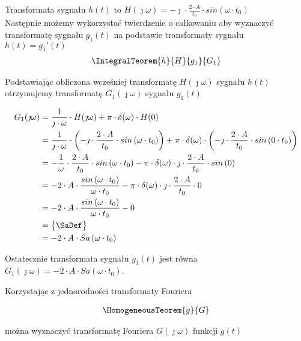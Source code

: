 \begin{task}
Transformata sygnału $h(t)$ to $H(\jmath \omega)=-\jmath \cdot \frac{2\cdot A}{t_0} \cdot sin\left( \omega \cdot t_0\right)$
\\

Następnie możemy wykorzystać twierdzenie o całkowaniu aby wyznaczyć transformatę sygnału $g_1(t)$ na podstawie transformaty sygnału $h(t)=g_1'(t)$
\begin{align*}
\IntegralTeorem{h}{H}{g_1}{G_1}
\end{align*}

Podstawiając obliczona wcześniej transformatę $H(\jmath \omega)$ sygnału $h(t)$ otrzymujemy transformatę $G_1(\jmath \omega)$ sygnału $g_1(t)$

\begin{align*}
G_1(\jmath \omega) &= \frac{1}{\jmath \cdot \omega} \cdot H(\jmath \omega) + \pi \cdot \delta(\omega) \cdot H(0)\\
&=\frac{1}{\jmath \cdot \omega} \cdot \left(-\jmath \cdot \frac{2\cdot A}{t_0} \cdot sin\left( \omega \cdot t_0\right)\right) + \pi \cdot \delta(\omega) \cdot \left(-\jmath \cdot \frac{2\cdot A}{t_0} \cdot sin\left( 0 \cdot t_0\right)\right)\\
&=-\frac{1}{\omega} \cdot \frac{2\cdot A}{t_0}\cdot sin\left( \omega \cdot t_0\right) - \pi \cdot \delta(\omega) \cdot \jmath \cdot \frac{2\cdot A}{t_0} \cdot sin\left( 0\right)\\
&=-2\cdot A \cdot \frac{sin\left( \omega \cdot t_0\right)}{\omega \cdot t_0} - \pi \cdot \delta(\omega) \cdot \jmath \cdot \frac{2\cdot A}{t_0} \cdot 0\\
&= -2\cdot A \cdot \frac{sin\left( \omega \cdot t_0\right)}{\omega \cdot t_0} - 0\\
&=\begin{Bmatrix}
\SaDef
\end{Bmatrix}\\
&=-2\cdot A \cdot Sa\left( \omega \cdot t_0\right)\\
\end{align*}

Ostatecznie transformata sygnału $g_1(t)$ jest równa $G_1(\jmath \omega)=- 2\cdot A \cdot Sa\left( \omega \cdot t_0\right)$.

Korzystając z jednorodności transformaty Fouriera 

\begin{align*}
\HomogeneousTeorem{g}{G}
\end{align*}

można wyznaczyć transformatę Fouriera $G(\jmath \omega)$ funkcji $g(t)$


\end{task}
